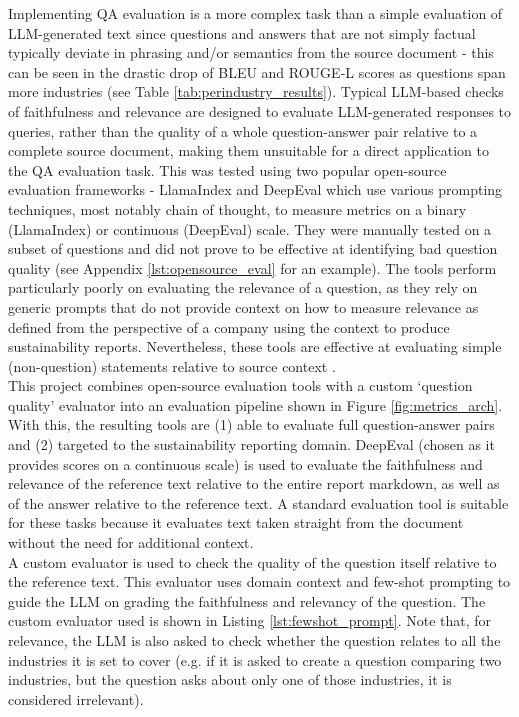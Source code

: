 Implementing QA evaluation is a more complex task than a simple evaluation of LLM-generated text since questions and answers that are not simply factual typically deviate in phrasing and/or semantics from the source document - this can be seen in the drastic drop of BLEU and ROUGE-L scores as questions span more industries (see Table \ref{tab:perindustry_results}). Typical LLM-based checks of faithfulness and relevance are designed to evaluate LLM-generated responses to queries, rather than the quality of a whole question-answer pair relative to a complete source document, making them unsuitable for a direct application to the QA evaluation task. This was tested using two popular open-source evaluation frameworks - LlamaIndex \cite{llamaindex_eval} and DeepEval \cite{deepeval} which use various prompting techniques, most notably chain of thought, to measure metrics on a binary (LlamaIndex) or continuous (DeepEval) scale. They were manually tested on a subset of questions and did not prove to be effective at identifying bad question quality (see Appendix \ref{lst:opensource_eval} for an example). The tools perform particularly poorly on evaluating the relevance of a question, as they rely on generic prompts that do not provide context on how to measure relevance as defined from the perspective of a company using the context to produce sustainability reports. Nevertheless, these tools are effective at evaluating simple (non-question) statements relative to source context \cite{deepeval_paper}. \\

This project combines open-source evaluation tools with a custom `question quality' evaluator into an evaluation pipeline shown in Figure \ref{fig:metrics_arch}. With this, the resulting tools are (1) able to evaluate full question-answer pairs and (2) targeted to the sustainability reporting domain. DeepEval (chosen as it provides scores on a continuous scale) is used to evaluate the faithfulness and relevance of the reference text relative to the entire report markdown, as well as of the answer relative to the reference text. A standard evaluation tool is suitable for these tasks because it evaluates text taken straight from the document without the need for additional context.\\

A custom evaluator is used to check the quality of the question itself relative to the reference text. This evaluator uses domain context and few-shot prompting to guide the LLM on grading the faithfulness and relevancy of the question. The custom evaluator used is shown in Listing \ref{lst:fewshot_prompt}. Note that, for relevance, the LLM is also asked to check whether the question relates to all the industries it is set to cover (e.g. if it is asked to create a question comparing two industries, but the question asks about only one of those industries, it is considered irrelevant). \\

